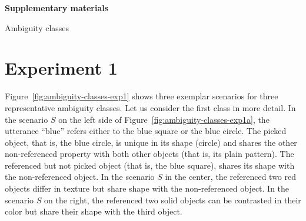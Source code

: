 \documentclass[10pt,a4paper]{article}
\date{}
\begin{document}
\begin{minipage}{.99\linewidth}
\centering
\large{

\textbf{Supplementary materials} 

Ambiguity classes}
\end{minipage}

\section*{Experiment 1}

Figure~\ref{fig:ambiguity-classes-exp1} shows three exemplar scenarios for three representative ambiguity classes. 
Let us consider the first class in more detail.
In the scenario $S$ on the left side of Figure~\ref{fig:ambiguity-classes-exp1a}, 
the utterance ``blue'' refers either to the blue square or the blue circle.
The picked object, that is, the blue circle, is unique in its shape (circle) and shares the other non-referenced property with both other objects (that is, its plain pattern). 
The referenced but not picked object (that is, the blue square), shares its shape with the non-referenced object. 
In the scenario $S$ in the center, the referenced two red objects differ in texture but share shape with the non-referenced object.
In the scenario $S$ on the right, the referenced two solid objects can be contrasted in their color but share their shape with the third object.
\end{document}
